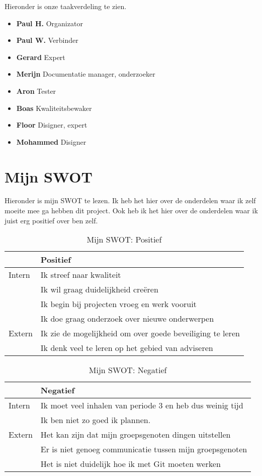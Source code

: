 \documentclass{article}
\begin{document}
Hieronder is onze taakverdeling te zien.

\begin{itemize}
  \item \textbf{Paul H.} Organizator
  \item \textbf{Paul W.} Verbinder 
  \item \textbf{Gerard} Expert 
  \item \textbf{Merijn} Documentatie manager, onderzoeker
  \item \textbf{Aron} Tester
  \item \textbf{Boas} Kwaliteitsbewaker 
  \item \textbf{Floor} Disigner, expert
  \item \textbf{Mohammed} Disigner
\end{itemize}

\section{Mijn SWOT}

Hieronder is mijn SWOT te lezen.
Ik heb het hier over de onderdelen waar ik zelf moeite mee ga hebben dit project.
Ook heb ik het hier over de onderdelen waar ik juist erg positief over ben zelf.

\begin{table}[h!]
\caption{Mijn SWOT: Positief}
\label{tab: Mijn SWOT: Positief}
\begin{tabular}{l|l}
        & \textbf{Positief} \\
        \hline
        {Intern} 	& Ik streef naar kwaliteit \\ 
			& Ik wil graag duidelijkheid cre\"eren \\
			& Ik begin bij projecten vroeg en werk vooruit \\
			& Ik doe graag onderzoek over nieuwe onderwerpen \\
        {Extern}	& Ik zie de mogelijkheid om over goede beveiliging te leren \\ 
			& Ik denk veel te leren op het gebied van adviseren \\
\end{tabular}
\end{table}

\begin{table}[h!]
\caption{Mijn SWOT: Negatief}
\label{tab: Mijn SWOT: Negatief}
\begin{tabular}{l|l}
        & \textbf{Negatief} \\
        \hline
        {Intern} 	& Ik moet veel inhalen van periode 3 en heb dus weinig tijd \\ 
			& Ik ben niet zo goed ik plannen. \\
        {Extern}	& Het kan zijn dat mijn groepsgenoten dingen uitstellen \\ 
			& Er is niet genoeg communicatie tussen mijn groepsgenoten \\
			& Het is niet duidelijk hoe ik met Git moeten werken \\
\end{tabular}
\end{table}
\end{document}
